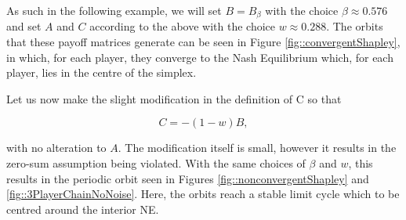 \documentclass{article}
\theoremstyle{definition}
\begin{document}
  As such in the following example, we will set $B = B_\beta$ with the choice $\beta \approx 0.576$ and set $A$ and $C$ according to the above with the choice $w \approx 0.288$. The orbits that these payoff matrices generate can be seen in Figure \ref{fig::convergentShapley}, in which, for each player, they converge to the Nash Equilibrium which, for each player, lies in the centre of the simplex.

  Let us now make the slight modification in the definition of C so that

  \begin{equation} \label{eq::nonzeroSumShapley}
    C  = - (1 - w) B, 
  \end{equation}

  with no alteration to $A$. The modification itself is small, however it results in the zero-sum
  assumption being violated. With the same choices of $\beta$ and $w$, this results in the periodic
  orbit seen in Figures \ref{fig::nonconvergentShapley} and \ref{fig::3PlayerChainNoNoise}. Here,
  the orbits reach a stable limit cycle which to be centred around the interior NE.
\end{document}
